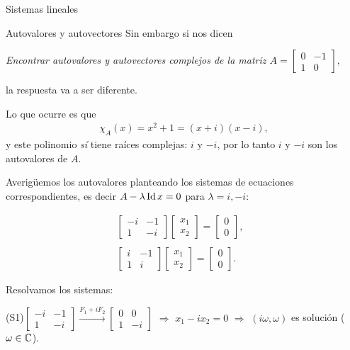 \begin{chapter}{Sistemas lineales}
\begin{section}{Autovalores y autovectores}
        Sin embargo si nos dicen 
        \begin{center}
            \textit{Encontrar autovalores y autovectores complejos de la matriz  $A= \begin{bmatrix}0&-1\\1&0\end{bmatrix}$}, 
        \end{center}
        la respuesta va a ser diferente. 

        Lo  que ocurre es que 
        \begin{align*}
        \chi_A(x)=x^2+1=(x+i)(x-i),
        \end{align*}
        y este polinomio \textit{sí} tiene raíces complejas: $i$ y $-i$, por lo tanto  $i$ y $-i$ son los autovalores de $A$.

        Averigüemos los autovalores planteando los sistemas de ecuaciones correspondientes,  es decir $A- \lambda \operatorname{Id} x =0$ para $\lambda=i, -i$:

        \begin{align*}
            \begin{bmatrix}  - i& -1\\ 1&-i\end{bmatrix}
            \begin{bmatrix}	x_1\\x_2\end{bmatrix}
            =
            \begin{bmatrix}	0\\0\end{bmatrix},
             \tag{S1}
            \\
            &
            \\
            \begin{bmatrix}	i&-1 \\ 1&i\end{bmatrix}
            \begin{bmatrix}	x_1\\x_2\end{bmatrix}
            =
            \begin{bmatrix}	0\\0\end{bmatrix}.
             \tag{S2}
        \end{align*}
        
        Resolvamos los sistemas:

        (S1)\quad $\begin{bmatrix}  - i& -1\\ 1&-i\end{bmatrix} \stackrel{F_1 +i F_2}{\longrightarrow} \begin{bmatrix} 0&0 \\ 1&-i \end{bmatrix}$  $\Rightarrow$ $x_1-i x_2=0$ $\Rightarrow$ $(i\omega ,\omega)$ es solución ($\omega \in \mathbb C$). 
   

\end{section}
\end{chapter}
